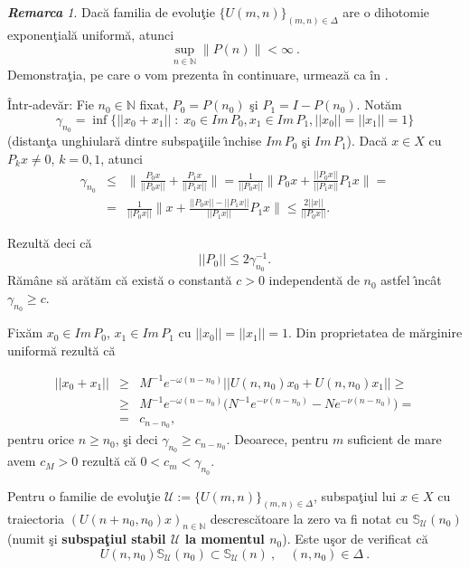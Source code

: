 \documentclass[ a4paper, 12pt]{report}
\newcommand{\N}{\mathbb{N}}
\newcommand{\defnemph}[1]{\textbf{#1}}
\theoremstyle{definition}
\theoremstyle{remark}
\newtheorem{remarc}{\bf Remarca}[section]
\numberwithin{equation}{section}
\begin{document}
\begin{remarc}
\label{boundedprojectors}
Dac\u a familia de evolu\c tie $\{U(m,n)\}_{(m,n)\in\Delta}$ are o {dihotomie exponen\c tial\u a uniform\u a}, atunci
$$\sup_{n\in\N}\|P(n)\| <\infty\ .$$
Demonstra\c tia, pe care o vom prezenta \^in continuare, urmeaz\u a ca \^in \cite[Lema~4.2]{MinhRabigerSchnaubelt}.

\^ Intr-adev\u ar: Fie $n_0 \in \mathbb{N}$ fixat, $P_0 = P(n_0)$ \c si $P_1 = I - P(n_0)$. Not\u am
$$\gamma_{n_0} = \inf \{ ||x_0 + x_1|| \; : \; x_0 \in Im\, P_0, x_1 \in Im\, P_1, ||x_0|| = ||x_1|| = 1\}$$
(distan\c ta unghiular\u a dintre subspa\c tiile \^\i nchise $Im\, P_0$ \c si $Im\, P_1$). Dac\u a $x\in X$ cu $P_k x \not= 0$, $k = 0, 1$, atunci
\begin{eqnarray*}
\gamma_{n_0}&\leq& \lVert \frac{P_0x}{||P_0x||} + \frac{P_1x}{||P_1x||} \rVert = \frac{1}{||P_0x||}\lVert P_0x + \frac{||P_0x||}{||P_1x||} P_1x \rVert = \\
&=& \frac{1}{||P_0x||}\lVert x + \frac{||P_0x|| - ||P_1x||}{||P_1x||} P_1x \rVert \leq \frac{2||x||}{||P_0x||}.
\end{eqnarray*}

Rezult\u a deci c\u a
$$||P_0|| \leq 2\gamma^{- 1}_{n_0}.$$
R\u am\^ ane s\u a ar\u at\u am c\u a exist\u a o constant\u a $c > 0$ independent\u a de $n_0$ astfel \^\i nc\^ at $\gamma_{n_0} \geq c$.

Fix\u am $x_0 \in Im\, P_0$, $x_1\in Im\, P_1$ cu $||x_0|| = ||x_1|| = 1$. Din proprietatea de m\u arginire uniform\u a rezult\u a c\u a

\begin{eqnarray*}
||x_0 + x_1|| &\geq& M^{-1} e^{- \omega (n - n_0)}|| U(n, n_0)x_0 + U(n, n_0)x_1|| \geq \\
&\geq&  M^{-1} e^{- \omega (n - n_0)}\Big(  N^{-1} e^{- \nu (n - n_0)} -  N e^{- \nu (n - n_0)}\Big)= \\
&=&c_{n - n_0},
\end{eqnarray*}
pentru orice $n \geq n_0$, \c si deci $\gamma_{n_0} \geq c_{n - n_0}$. Deoarece, pentru $m$ suficient de mare avem $c_M > 0$ rezult\u a c\u a $0 < c_m < \gamma_{n _0}$.


\end{remarc}

Pentru o familie de evolu\c tie
$\mathcal{U}:=\{U(m,n)\}_{(m,n)\in\Delta}$, subspa\c tiul lui
$x\in X$ cu traiectoria $(U(n+n_0,n_0)x)_{n\in\N}$
descresc\u atoare la zero va fi notat cu
$\mathbb{S}_{\mathcal{U}}(n_0)$ (numit \c si
\defnemph{subspa\c tiul stabil $\mathcal{U}$ la momentul $n_0$}).
Este u\c sor de verificat c\u a
\begin{equation}
U(n,n_0)\mathbb{S}_{\mathcal{U}}(n_0)\subset \mathbb{S}_{\mathcal{U}}(n)\ ,\quad (n,n_0)\in\Delta\ .
\end{equation}
\end{document}
